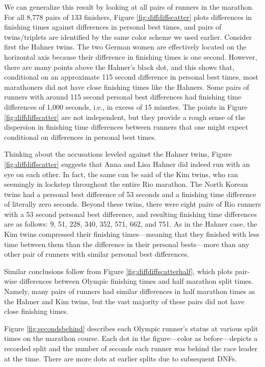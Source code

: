 \documentclass[12pt,titlepage]{article}
\begin{document}
We can generalize this result by looking at all pairs of runners in
the marathon.  For all 8,778 pairs of 133 finishers, Figure
\ref{fig:diffdiffscatter} plots differences in finishing times against
differences in personal best times, and pairs of twins/triplets are
identified by the same color scheme we used earlier.  Consider first
the Hahner twins.  The two German women are effectively located on the
horizontal axis because their difference in finishing times is one
second.  However, there are many points above the Hahner's black dot,
and this shows that, conditional on an approximate 115 second
difference in personal best times, most marathoners did not have close
finishing times like the Hahners.  Some pairs of runners with around
115 second personal best differences had finishing time differences of
1,000 seconds, i.e., in excess of 15 minutes.  The points in Figure
\ref{fig:diffdiffscatter} are not independent, but they provide a
rough sense of the dispersion in finishing time differences between
runners that one might expect conditional on differences in personal
best times.

Thinking about the accusations leveled against the Hahner twins,
Figure \ref{fig:diffdiffscatter} suggests that Anna and Lisa Hahner
did indeed run with an eye on each other.  In fact, the same can be
said of the Kim twins, who ran seemingly in lockstep throughout the
entire Rio marathon.  The North Korean twins had a personal best
difference of 53 seconds and a finishing time difference of literally
zero seconds.  Beyond these twins, there were eight pairs of Rio
runners with a 53 second personal best difference, and resulting
finishing time differences are as follows: 9, 51, 228, 340, 352, 571,
662, and 751.  As in the Hahner case, the Kim twins compressed their
finishing times---meaning that they finished with less time between
them than the difference in their personal bests---more than any other
pair of runners with similar personal best differences.

Similar conclusions follow from Figure \ref{fig:diffdiffscatterhalf},
which plots pair-wise differences between Olympic finishing times and
half marathon split times.  Namely, many pairs of runners had similar
differences in half marathon times as the Hahner and Kim twins, but
the vast majority of these pairs did not have close finishing times.

Figure \ref{fig:secondsbehind} describes each Olympic runner's status
at various split times on the marathon course.  Each dot in the
figure---color as before---depicts a recorded split and the number of
seconds each runner was behind the race leader at the time.  There are
more dots at earlier splits due to subsequent DNFs. 
\end{document}
